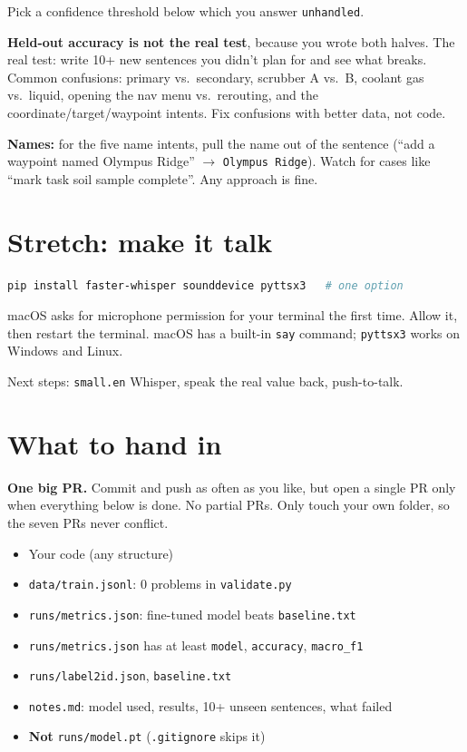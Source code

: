 \documentclass[11pt]{article}
\begin{document}
Pick a confidence threshold below which you answer \texttt{unhandled}.

\textbf{Held-out accuracy is not the real test}, because you wrote both halves.
The real test: write 10+ new sentences you didn't plan for and see what
breaks. Common confusions:
primary vs.\ secondary, scrubber A vs.\ B, coolant gas vs.\ liquid, opening
the nav menu vs.\ rerouting, and the coordinate/target/waypoint intents. Fix confusions with better data, not code.

\textbf{Names:} for the five name intents, pull the name out of the sentence
(``add a waypoint named Olympus Ridge'' $\to$ \texttt{Olympus Ridge}). Watch for
cases like ``mark task soil sample complete''. Any approach is fine.

\newpage
\section{Stretch: make it talk}

\begin{lstlisting}[language=bash]
pip install faster-whisper sounddevice pyttsx3   # one option
\end{lstlisting}

macOS asks for microphone permission for your terminal the first time. Allow
it, then restart the terminal. macOS has a built-in \texttt{say} command;
\texttt{pyttsx3} works on Windows and Linux.



Next steps: \texttt{small.en} Whisper, speak the real value back, push-to-talk.

\newpage
\section{What to hand in}

\textbf{One big PR.} Commit and push as often as you like, but open a single PR only
when everything below is done. No partial PRs. Only touch your own folder, so
the seven PRs never conflict.

\begin{itemize}[label=$\square$]
  \item Your code (any structure)
  \item \texttt{data/train.jsonl}: 0 problems in \texttt{validate.py}
  \item \texttt{runs/metrics.json}: fine-tuned model beats \texttt{baseline.txt}
  \item \texttt{runs/metrics.json} has at least \texttt{model}, \texttt{accuracy}, \texttt{macro\_f1}
  \item \texttt{runs/label2id.json}, \texttt{baseline.txt}
  \item \texttt{notes.md}: model used, results, 10+ unseen sentences, what failed
  \item \textbf{Not} \texttt{runs/model.pt} (\texttt{.gitignore} skips it)
\end{itemize}
\end{document}
